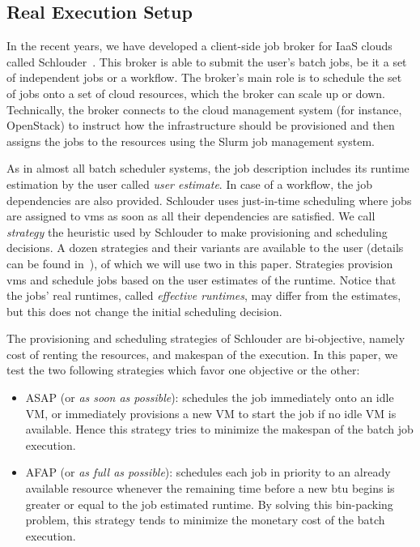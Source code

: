 \documentclass[10pt,conference,compsocconf]{IEEEtran}
\begin{document}
\subsection{Real Execution Setup}

In the recent years, we have developed  a client-side job broker for IaaS clouds
called  Schlouder~\cite{Michon17}.  This  broker is  able to  submit the  user's
batch jobs, be  it a set of  independent jobs or a workflow.   The broker's main
role is  to schedule the set  of jobs onto a  set of cloud resources,  which the
broker can scale up  or down.
Technically, the broker  connects to the cloud management  system (for instance,
OpenStack) to  instruct how  the infrastructure should  be provisioned  and then
assigns the jobs to the resources using the Slurm job management system.

As  in almost  all batch  scheduler systems,  the job  description includes  its
runtime  estimation by  the  user called  \emph{user estimate}.   In  case of  a
workflow, the job  dependencies are also provided.   Schlouder uses just-in-time
scheduling where jobs are assigned to \acp{vm} as soon as all their dependencies
are satisfied.  We call \emph{strategy} the  heuristic used by Schlouder to make
provisioning and  scheduling decisions.  A  dozen strategies and  their variants
are available to  the user (details can be found  in~\cite{GenaudG11}), of which
we will use two in this  paper.  Strategies provision \acp{vm} and schedule jobs
based  on  the user  estimates  of  the runtime.   Notice  that  the jobs'  real
runtimes, called \emph{effective  runtimes}, may differ from  the estimates, but
this does not change the initial scheduling decision.

The provisioning and scheduling strategies of Schlouder are bi-objective, namely
cost of renting the resources, and makespan of the execution.  In this paper, we
test the two following strategies which favor one objective or the other:
\begin{itemize}
\item ASAP (or \textit{as soon as possible}): schedules the job immediately onto
  an idle VM, or immediately provisions a new  VM to start the job if no idle VM
  is available.  Hence this strategy tries to minimize the makespan of the batch
  job execution.

\item AFAP (or \textit{as full as  possible}): schedules each job in priority to
	an already available resource whenever the remaining time  before a new
	\ac{btu} begins is greater or equal to the job estimated runtime.
	By solving this bin-packing problem, this strategy tends to minimize the
	monetary cost of the batch execution.
\end{itemize}
\end{document}

